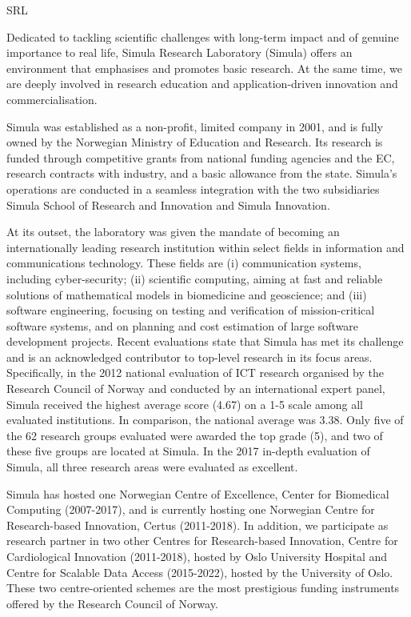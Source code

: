 \begin{sitedescription}{SRL}

Dedicated to tackling scientific challenges with long-term impact and of
genuine importance to real life, Simula Research Laboratory (Simula) offers an
environment that emphasises and promotes basic research. At the same time, we
are deeply involved in research education and application-driven innovation and
commercialisation.

Simula was established as a non-profit, limited company in 2001, and is fully
owned by the Norwegian Ministry of Education and Research. Its research is
funded through competitive grants from national funding agencies and the EC,
research contracts with industry, and a basic allowance from the state.
Simula’s operations are conducted in a seamless integration with the two
subsidiaries Simula School of Research and Innovation and Simula Innovation.

At its outset, the laboratory was given the mandate of becoming an
internationally leading research institution within select fields in
information and communications technology. These fields are (i) communication
systems, including cyber-security; (ii) scientific computing, aiming at fast
and reliable solutions of mathematical models in biomedicine and geoscience;
and (iii) software engineering, focusing on testing and verification of
mission-critical software systems, and on planning and cost estimation of large
software development projects. Recent evaluations state that Simula has met its
challenge and is an acknowledged contributor to top-level research in its focus
areas. Specifically, in the 2012 national evaluation of ICT research organised
by the Research Council of Norway and conducted by an international expert
panel, Simula received the highest average score (4.67) on a 1-5 scale among
all evaluated institutions. In comparison, the national average was 3.38. Only
five of the 62 research groups evaluated were awarded the top grade (5), and
two of these five groups are located at Simula. In the 2017 in-depth evaluation
of Simula, all three research areas were evaluated as excellent.

Simula has hosted one Norwegian Centre of Excellence, Center for Biomedical
Computing (2007-2017), and is currently hosting one Norwegian Centre for
Research-based Innovation, Certus (2011-2018). In addition, we participate as
research partner in two other Centres for Research-based Innovation, Centre for
Cardiological Innovation (2011-2018), hosted by Oslo University Hospital and
Centre for Scalable Data Access (2015-2022), hosted by the University of Oslo.
These two centre-oriented schemes are the most prestigious funding instruments
offered by the Research Council of Norway.


\end{sitedescription}

